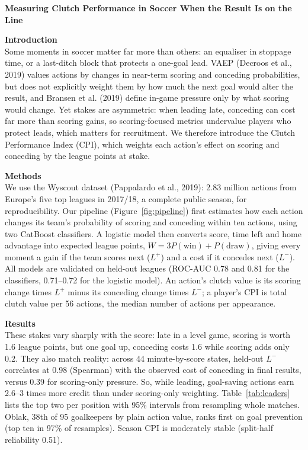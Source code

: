 \documentclass[10pt]{article}
\begin{document}
\begin{center}
{\large\bfseries Measuring Clutch Performance in Soccer When the Result Is on the Line}
\end{center}
\vspace{-6pt}
\noindent\textbf{Introduction}\\
Some moments in soccer matter far more than others: an equaliser in stoppage time, or a last-ditch block that protects a one-goal lead. VAEP (Decroos et al., 2019) values actions by changes in near-term scoring and conceding probabilities, but does not explicitly weight them by how much the next goal would alter the result, and Bransen et al. (2019) define in-game pressure only by what scoring would change. Yet stakes are asymmetric: when leading late, conceding can cost far more than scoring gains, so scoring-focused metrics undervalue players who protect leads, which matters for recruitment. We therefore introduce the Clutch Performance Index (CPI), which weights each action's effect on scoring and conceding by the league points at stake.

\noindent\textbf{Methods}\\
We use the Wyscout dataset (Pappalardo et al., 2019): 2.83 million actions from Europe's five top leagues in 2017/18, a complete public season, for reproducibility. Our pipeline (Figure~\ref{fig:pipeline}) first estimates how each action changes its team's probability of scoring and conceding within ten actions, using two CatBoost classifiers. A logistic model then converts score, time left and home advantage into expected league points, $W = 3P(\text{win}) + P(\text{draw})$, giving every moment a gain if the team scores next ($L^{+}$) and a cost if it concedes next ($L^{-}$). All models are validated on held-out leagues (ROC-AUC 0.78 and 0.81 for the classifiers, 0.71--0.72 for the logistic model). An action's clutch value is its scoring change times $L^{+}$ minus its conceding change times $L^{-}$; a player's CPI is total clutch value per 56 actions, the median number of actions per appearance.

\noindent\textbf{Results}\\
These stakes vary sharply with the score: late in a level game, scoring is worth 1.6 league points, but one goal up, conceding costs 1.6 while scoring adds only 0.2. They also match reality: across 44 minute-by-score states, held-out $L^{-}$ correlates at 0.98 (Spearman) with the observed cost of conceding in final results, versus 0.39 for scoring-only pressure. So, while leading, goal-saving actions earn 2.6--3 times more credit than under scoring-only weighting. Table~\ref{tab:leaders} lists the top two per position with 95\% intervals from resampling whole matches. Oblak, 38th of 95 goalkeepers by plain action value, ranks first on goal prevention (top ten in 97\% of resamples). Season CPI is moderately stable (split-half reliability 0.51).
\end{document}
